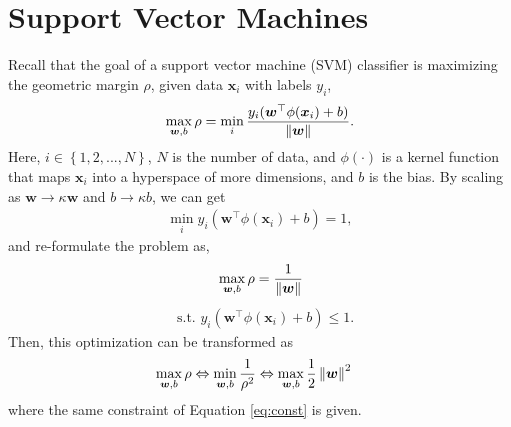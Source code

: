 \documentclass[journal,onecolumn,12pt]{IEEEtran}
\newcommand{\norm}[1]{\left\lVert#1\right\rVert}
\begin{document}
\pagebreak
\section{Support Vector Machines}
Recall that the goal of a support vector machine (SVM) classifier is maximizing the geometric margin $\rho$, given data $\boldsymbol{x}_i$ with labels $y_i$,
\begin{equation}
\begin{aligned}
\max_{\boldsymbol{w}, b} \rho = \min_{i} { { y_i (\boldsymbol{w}^\top {\phi} (\boldsymbol{x}_i) + b)} \over { \norm{\boldsymbol{w}}} }.
\end{aligned}
\end{equation}
Here, $i \in \left\lbrace 1, 2, ..., N \right\rbrace$, $N$ is the number of data, and ${\phi}(\cdot)$ is a kernel function that maps $\boldsymbol{x}_i$ into a hyperspace of more dimensions, and $b$ is the bias. By scaling as $\boldsymbol{w} \rightarrow \kappa \boldsymbol{w}$ and $b \rightarrow \kappa b$, we can get
\begin{equation}
\begin{aligned}
\min_{i} { y_i (\boldsymbol{w}^\top {\phi} (\boldsymbol{x}_i) + b)} = 1,
\end{aligned}
\end{equation}
and re-formulate the problem as, 
\begin{equation}
\begin{aligned}
&\max_{\boldsymbol{w}, b} \rho =   {{1} \over {\norm{\boldsymbol{w}}}} \\
\end{aligned}
\end{equation}
\begin{equation}
\begin{aligned}
&\text{s.t. } {y_i (\boldsymbol{w}^\top {\phi} (\boldsymbol{x}_i) + b)} \leq 1.
\end{aligned}
\label{eq:const}
\end{equation}
Then, this optimization can be transformed as
\begin{equation}
\begin{aligned}
&\max_{\boldsymbol{w}, b} \rho \Leftrightarrow  \min_{\boldsymbol{w}, b} {1 \over{\rho^2}}\Leftrightarrow \max_{\boldsymbol{w}, b} {1 \over 2} \norm{\boldsymbol{w}}^2
\end{aligned}
\label{eq:hw4form}
\end{equation}
where the same constraint of Equation \ref{eq:const} is given.
\end{document}
